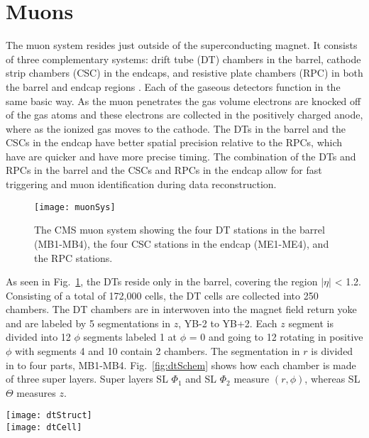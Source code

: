   \section{Muons}
    The muon system resides just outside of the superconducting magnet.
    It consists of three complementary systems: drift tube (DT) chambers in the
      barrel, cathode strip chambers (CSC) in the endcaps, and resistive 
      plate chambers (RPC) in both the barrel and endcap regions \cite{tCmsE}.
    Each of the gaseous detectors function in the same basic way.
    As the muon penetrates the gas volume electrons are knocked off of the 
      gas atoms and these electrons are collected in the positively charged
      anode, where as the ionized gas moves to the cathode. 
    The DTs in the barrel and the CSCs in the endcap have better spatial 
      precision relative to the RPCs, which have are quicker and have more
      precise timing. 
    The combination of the DTs and RPCs in the barrel and the CSCs and RPCs 
      in the endcap allow for fast triggering and muon identification during
      data reconstruction. 

    \begin{figure}[!Hhbt]
      \centering
      \texttt{[image: muonSys]}
      \caption{ The CMS muon system showing the four DT stations in 
        the barrel (MB1-MB4), the four CSC stations in the endcap (ME1-ME4), 
        and the RPC stations.}
      \label{fig:muonSys}
    \end{figure}

    As seen in Fig.~\ref{fig:muonSys}, the DTs reside only in the barrel, 
      covering the region $|\eta|$ < 1.2.
    Consisting of a total of 172,000 cells, the DT cells are collected into
      250 chambers. 
    The DT chambers are in interwoven into the magnet field return yoke and are
      labeled by 5 segmentations in $z$, YB-2 to YB+2.
    Each $z$ segment is divided into 12 $\phi$ segments labeled 1 at $\phi$ = 0
      and going to 12 rotating in positive $\phi$ with segments 4 and 10 
      contain 2 chambers.
   The segmentation in $r$ is divided in to four parts, MB1-MB4.
   Fig.~\ref{fig:dtSchem} shows how each chamber is made of three super layers.
   Super layers SL $\Phi_{1}$ and SL $\Phi_{2}$ measure $(r,\phi)$, whereas 
    SL $\Theta$ measures $z$.

    \begin{figure*}[!Hhbt]
      \centering
      \texttt{[image: dtStruct]} \\
      \texttt{[image: dtCell]}
      \caption{Schematic of the DT chambers and an individual DT cell.}
      \label{fig:dtSchem}
    \end{figure*}

